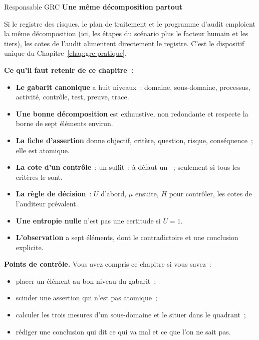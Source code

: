 \begin{boxmetier}{Responsable GRC}
\textbf{Une même décomposition partout}

Si le registre des risques, le plan de traitement et le programme d'audit
emploient la même décomposition (ici, les étapes du scénario plus le
facteur humain et les tiers), les cotes de l'audit alimentent directement le
registre. C'est le dispositif unique du Chapitre~\ref{chap:grc-pratique}.
\end{boxmetier}

\separateur

\begin{boxresume}
\textbf{Ce qu'il faut retenir de ce chapitre~:}
\begin{itemize}
    \item \textbf{Le gabarit canonique} a huit niveaux~: domaine,
          sous-domaine, processus, activité, contrôle, test, preuve, trace.
    \item \textbf{Une bonne décomposition} est exhaustive, non redondante et
          respecte la borne de sept éléments environ.
    \item \textbf{La fiche d'assertion} donne objectif, critère, question,
          risque, conséquence~; elle est atomique.
    \item \textbf{La cote d'un contrôle}~: un \NON{} suffit~; à défaut un
          \NEK{}~; \OUI{} seulement si tous les critères le sont.
    \item \textbf{La règle de décision}~: $U$ d'abord, $\mu$ ensuite, $H$
          pour contrôler, les cotes de l'auditeur prévalent.
    \item \textbf{Une entropie nulle} n'est pas une certitude si $U = 1$.
    \item \textbf{L'observation} a sept éléments, dont le contradictoire et
          une conclusion explicite.
\end{itemize}
\end{boxresume}

\begin{boxinfo}
\textbf{Points de contrôle.} Vous avez compris ce chapitre si vous savez~:
\begin{itemize}
    \item placer un élément au bon niveau du gabarit~;
    \item scinder une assertion qui n'est pas atomique~;
    \item calculer les trois mesures d'un sous-domaine et le situer dans le
          quadrant~;
    \item rédiger une conclusion qui dit ce qui va mal et ce que l'on ne
          sait pas.
\end{itemize}
\end{boxinfo}

